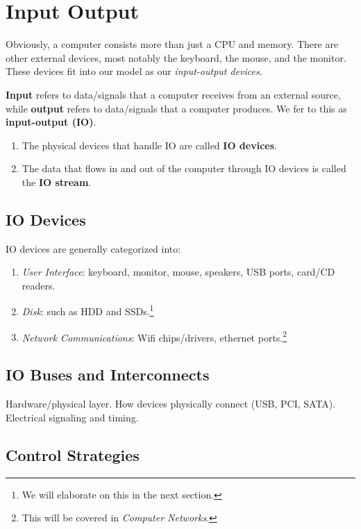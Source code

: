 \section{Input Output}

  Obviously, a computer consists more than just a CPU and memory. There are other external devices, most notably the keyboard, the mouse, and the monitor. These devices fit into our model as our \textit{input-output devices}. 

  \begin{definition}
    \textbf{Input} refers to data/signals that a computer receives from an external source, while \textbf{output} refers to data/signals that a computer produces. We fer to this as \textbf{input-output (IO)}. 
    \begin{enumerate}
      \item The physical devices that handle IO are called \textbf{IO devices}. 
      \item The data that flows in and out of the computer through IO devices is called the \textbf{IO stream}. 
    \end{enumerate}
  \end{definition}

\subsection{IO Devices}

  IO devices are generally categorized into: 
  \begin{enumerate}
    \item \textit{User Interface}: keyboard, monitor, mouse, speakers, USB ports, card/CD readers. 
    \item \textit{Disk}: such as HDD and SSDs.\footnote{We will elaborate on this in the next section. }
    \item \textit{Network Communications}: Wifi chips/drivers, ethernet ports.\footnote{This will be covered in \textit{Computer Networks}. }
  \end{enumerate}

\subsection{IO Buses and Interconnects}
  
  Hardware/physical layer. How devices physically connect (USB, PCI, SATA). Electrical signaling and timing. 

\subsection{Control Strategies}

